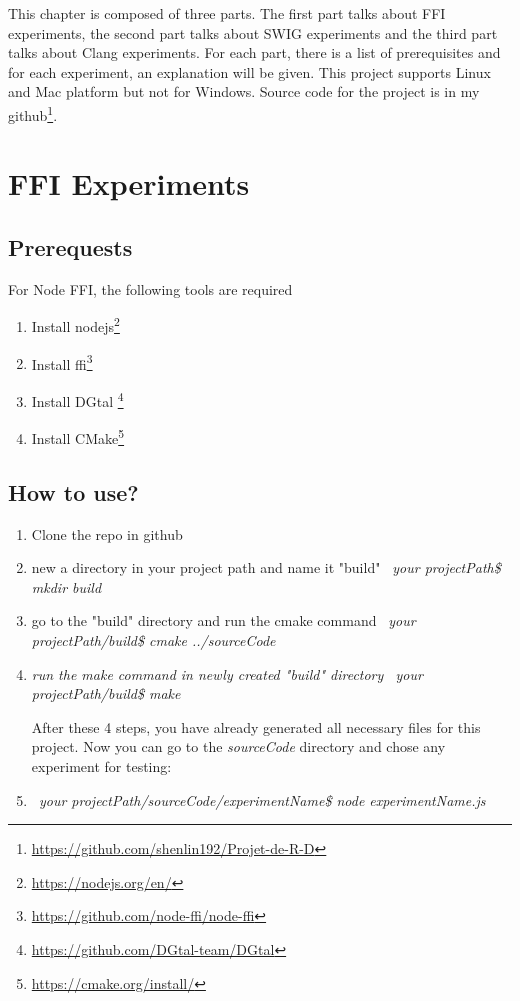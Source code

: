 \label{chap:Experiments}
This chapter is composed of three parts. The first part talks about FFI experiments, the second part talks about SWIG experiments and the third part talks about Clang experiments. For each part, there is a list of prerequisites and for each experiment, an explanation will be given. This project supports Linux and Mac platform but not for Windows. Source code for the project is in my github\footnote{\url{https://github.com/shenlin192/Projet-de-R-D}}.


\section{FFI Experiments} 

\subsection{Prerequests}
For Node FFI, the following tools are required
    \begin{enumerate}
       \item Install nodejs\footnote{\url{https://nodejs.org/en/}}
       \item Install ffi\footnote{\url{https://github.com/node-ffi/node-ffi}}  
        \item Install DGtal \footnote{\url{https://github.com/DGtal-team/DGtal}}
        \item Install CMake\footnote{\url{https://cmake.org/install/}}
    \end{enumerate}
       
\subsection{How to use?}
    \begin{enumerate}
        \item Clone the repo in github
        \item new a directory in your project path and name it "build" \textit{~your projectPath\$ mkdir build}
        \item go to the "build" directory and run the cmake command \textit{~your projectPath/build\$ cmake ../sourceCode}
        \item \textit{run the make command in newly created "build" directory ~your projectPath/build\$ make}

    After these 4 steps, you have already generated all necessary files for this project.
    Now you can go to the \textit{sourceCode} directory and chose any experiment for testing:

        \item \textit{~your projectPath/sourceCode/experimentName\$ node experimentName.js}
    \end{enumerate}   
       
